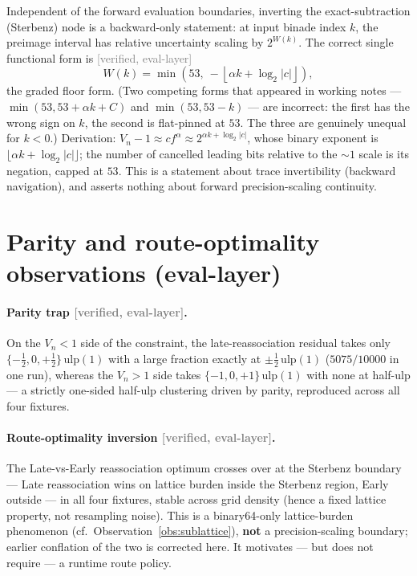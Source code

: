 \documentclass[11pt,a4paper]{article}
\newcommand{\status}[1]{\textcolor{gray}{\small\textsf{[#1]}}}
\begin{document}
Independent of the forward evaluation boundaries, inverting the exact-subtraction (Sterbenz) node is a backward-only statement: at input binade index $k$, the preimage interval has relative uncertainty scaling by $2^{W(k)}$. The correct single functional form is \status{verified, eval-layer}
\[
    W(k)=\min\!\left(53,\ -\left\lfloor \alpha k+\log_2|c|\right\rfloor\right),
\]
the graded floor form. (Two competing forms that appeared in working notes --- $\min(53,53+\alpha k+C)$ and $\min(53,53-k)$ --- are incorrect: the first has the wrong sign on $k$, the second is flat-pinned at $53$. The three are genuinely unequal for $k<0$.) Derivation: $V_n-1\approx c f^\alpha\approx2^{\alpha k+\log_2|c|}$, whose binary exponent is $\lfloor\alpha k+\log_2|c|\rfloor$; the number of cancelled leading bits relative to the $\sim1$ scale is its negation, capped at $53$. This is a statement about trace invertibility (backward navigation), and asserts nothing about forward precision-scaling continuity.

\section{Parity and route-optimality observations (eval-layer)}\label{sec:parity}

\paragraph{Parity trap \status{verified, eval-layer}.} On the $V_n<1$ side of the constraint, the late-reassociation residual takes only $\{-\tfrac12,0,+\tfrac12\}\,\mathrm{ulp}(1)$ with a large fraction exactly at $\pm\tfrac12\,\mathrm{ulp}(1)$ ($5075/10000$ in one run), whereas the $V_n>1$ side takes $\{-1,0,+1\}\,\mathrm{ulp}(1)$ with none at half-ulp --- a strictly one-sided half-ulp clustering driven by parity, reproduced across all four fixtures.

\paragraph{Route-optimality inversion \status{verified, eval-layer}.} The Late-vs-Early reassociation optimum crosses over at the Sterbenz boundary --- Late reassociation wins on lattice burden inside the Sterbenz region, Early outside --- in all four fixtures, stable across grid density (hence a fixed lattice property, not resampling noise). This is a binary64-only lattice-burden phenomenon (cf.\ Observation~\ref{obs:sublattice}), \textbf{not} a precision-scaling boundary; earlier conflation of the two is corrected here. It motivates --- but does not require --- a runtime route policy.
\end{document}
